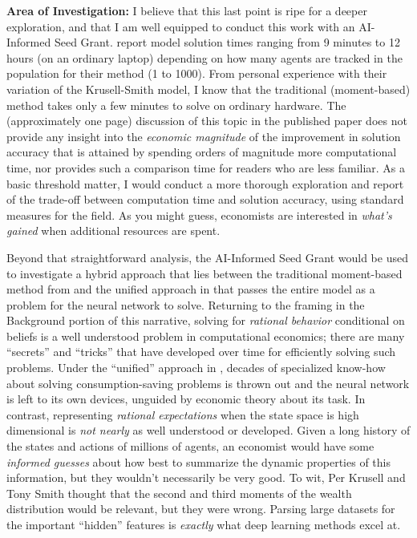 \documentclass[11pt,pdftex,letterpaper]{article}
\begin{document}
\vspace{0.25cm}

\noindent \textbf{Area of Investigation:} I believe that this last point is ripe for a deeper exploration, and that I am well equipped to conduct this work with an AI-Informed Seed Grant. \cite{MALIAR202176} report model solution times ranging from 9 minutes to 12 hours (on an ordinary laptop) depending on how many agents are tracked in the population for their method (1 to 1000). From personal experience with their variation of the Krusell-Smith model, I know that the traditional (moment-based) method takes only a few minutes to solve on ordinary hardware. The (approximately one page) discussion of this topic in the published paper does not provide any insight into the \textit{economic magnitude} of the improvement in solution accuracy that is attained by spending orders of magnitude more computational time, nor provides such a comparison time for readers who are less familiar. As a basic threshold matter, I would conduct a more thorough exploration and report of the trade-off between computation time and solution accuracy, using standard measures for the field. As you might guess, economists are interested in \textit{what's gained} when additional resources are spent.

Beyond that straightforward analysis, the AI-Informed Seed Grant would be used to investigate a hybrid approach that lies between the traditional moment-based method from \cite{KrusellSmith} and the unified approach in \cite{MALIAR202176} that passes the entire model as a problem for the neural network to solve. Returning to the framing in the Background portion of this narrative, solving for \textit{rational behavior} conditional on beliefs is a well understood problem in computational economics; there are many ``secrets'' and ``tricks'' that have developed over time for efficiently solving such problems. Under the ``unified'' approach in \cite{MALIAR202176}, decades of specialized know-how about solving consumption-saving problems is thrown out and the neural network is left to its own devices, unguided by economic theory about its task.  In contrast, representing \textit{rational expectations} when the state space is high dimensional is \textit{not nearly} as well understood or developed. Given a long history of the states and actions of millions of agents, an economist would have some \textit{informed guesses} about how best to summarize the dynamic properties of this information, but they wouldn't necessarily be very good. To wit, Per Krusell and Tony Smith thought that the second and third moments of the wealth distribution would be relevant, but they were wrong. Parsing large datasets for the important ``hidden'' features is \textit{exactly} what deep learning methods excel at.
\end{document}
